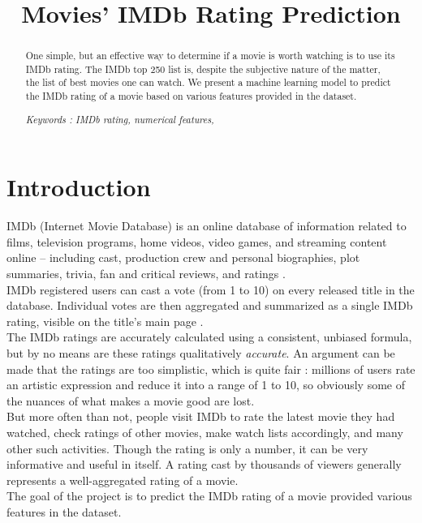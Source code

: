 \documentclass[conference]{IEEEtran}
\begin{document}
\title{Movies' IMDb Rating Prediction}
\author{
\and
{}
\and
{}
}
\maketitle
\begin{abstract}
One simple, but an effective way to determine if a movie is worth watching is to use its IMDb rating. The IMDb top 250 list is, despite the subjective nature of the matter, the list of best movies one can watch. We present a machine learning model to predict the IMDb rating of a movie based on various features provided in the dataset.

\textit{Keywords : IMDb rating, numerical features, }
\end{abstract}
\section{Introduction}
IMDb (Internet Movie Database) is an online database of information related to films, television programs, home videos, video games, and streaming content online – including cast, production crew and personal biographies, plot summaries, trivia, fan and critical reviews, and ratings \cite{IMDB}.\\
IMDb registered users can cast a vote (from 1 to 10) on every released title in the database. Individual votes are then aggregated and summarized as a single IMDb rating, visible on the title’s main page \cite{rating}.\\
The IMDb ratings are accurately calculated using a consistent, unbiased formula, but by no means are these ratings qualitatively \textit{accurate}. An argument can be made that the ratings are too simplistic, which is quite fair : millions of users rate an artistic expression and reduce it into a range of 1 to 10, so obviously some of the nuances of what makes a movie good are lost. \\
But more often than not, people visit IMDb to rate the latest movie they had watched, check ratings of other movies, make watch lists accordingly, and many other such activities. Though the rating is only a number, it can be very informative and useful in itself. A rating cast by thousands of viewers generally represents a well-aggregated rating of a movie. \\
The goal of the project is to predict the IMDb rating of a movie provided various features in the dataset.\\
\end{document}
